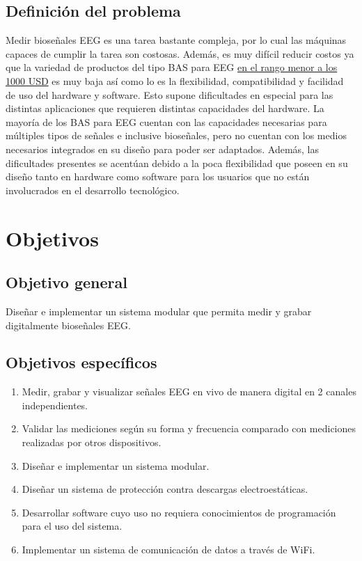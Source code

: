 \subsection{Definición del problema}
\label{sec:orgc23687b}
Medir bioseñales EEG es una tarea bastante compleja, por lo cual las máquinas capaces de cumplir la tarea son costosas. Además, es muy difícil reducir costos ya que la variedad de productos del tipo BAS para EEG \uline{en el rango menor a los 1000 USD} es muy baja así como lo es la flexibilidad, compatibilidad y facilidad de uso del hardware y software. Esto supone dificultades en especial para las distintas aplicaciones que requieren distintas capacidades del hardware. La mayoría de los BAS para EEG cuentan con las capacidades necesarias para múltiples tipos de señales e inclusive bioseñales, pero no cuentan con los medios necesarios integrados en su diseño para poder ser adaptados. Además, las dificultades presentes se acentúan debido a la poca flexibilidad que poseen en su diseño tanto en hardware como software para los usuarios que no están involucrados en el desarrollo tecnológico.
\section{Objetivos}
\label{sec:orge490128}
\subsection{Objetivo general}
\label{sec:orge9d2120}
Diseñar e implementar un sistema modular que permita medir y grabar digitalmente bioseñales EEG.
\subsection{Objetivos específicos}
\label{sec:org596e2d7}
\begin{enumerate}
\item Medir, grabar y visualizar señales EEG en vivo de manera digital en 2 canales independientes.
\item Validar las mediciones según su forma y frecuencia comparado con mediciones realizadas por otros dispositivos.
\item Diseñar e implementar un sistema modular.
\item Diseñar un sistema de protección contra descargas electroestáticas.
\item Desarrollar software cuyo uso no requiera conocimientos de programación para el uso del sistema.
\item Implementar un sistema de comunicación de datos a través de WiFi.
\end{enumerate}
